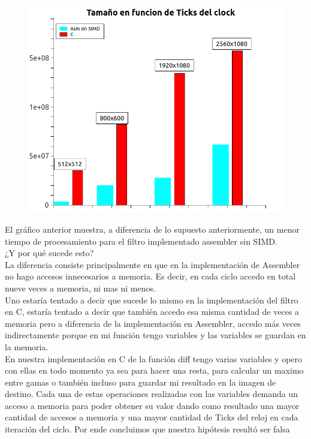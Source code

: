  \begin{figure}[H]
\begin{center}
  \includegraphics[width=\linewidth]{diffsinsimd/ASMssdC.png}
\end{center}
\end{figure}
El gráfico anterior muestra, a diferencia de lo supuesto anteriormente, un menor tiempo de procesamiento para el filtro implementado assembler sin SIMD.\\
¿Y por qué sucede esto?\\
La diferencia consiste principalmente en que en la implementación de Assembler no hago accesos innecesarios a memoria. Es decir, en cada ciclo accedo en total nueve veces a memoria, ni mas ni menos.\\
 Uno estaría tentado a decir que sucede lo mismo en la implementación del filtro en C, estaría tentado a decir que también accedo esa misma cantidad de veces a memoria pero a diferencia de la implementación en Assembler, accedo más veces indirectamente porque en mi función tengo variables y las variables se guardan en la memoria.\\
 En nuestra implementación en C de la función diff tengo varias variables y opero con ellas en todo momento ya sea para hacer una resta, para calcular un maximo entre gamas o también incluso para guardar mi resultado en la imagen de destino. Cada una de estas operaciones realizadas con las variables demanda un acceso a memoria para poder obtener su valor dando como resultado una mayor cantidad de accesos a memoria y una mayor cantidad de Ticks del reloj en cada iteración del ciclo. Por ende concluimos que nuestra hipótesis resultó ser falsa\\
 

  
 





